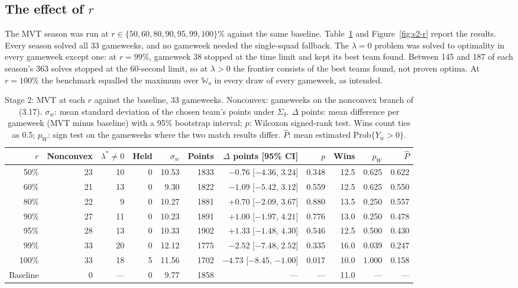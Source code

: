 \subsection{The effect of $r$}
\label{sec:s2-r}

The MVT season was run at $r\in\{50,60,80,90,95,99,100\}\%$ against the same baseline.
Table~\ref{tab:s2-r} and Figure~\ref{fig:s2-r} report the results. Every season solved all 33
gameweeks, and no gameweek needed the single-squad fallback. The $\lambda=0$ problem was solved
to optimality in every gameweek except one: at $r=99\%$, gameweek 38 stopped at the time limit
and kept its best team found. Between 145 and 187 of each season's 363 solves stopped at the
60-second limit, so at $\lambda>0$ the frontier consists of the best teams found, not proven
optima. At $r=100\%$ the benchmark equalled the maximum over $\mathbb{W}_o$ in every draw of
every gameweek, as intended.

\begin{table}[ht]
  \centering
  \caption{Stage 2: MVT at each $r$ against the baseline, 33 gameweeks. Nonconvex: gameweeks on
  the nonconvex branch of (3.17). $\sigma_w$: mean standard deviation of the chosen team's points
  under $\Sigma_\delta$. $\Delta$ points: mean difference per gameweek (MVT minus baseline) with a
  95\% bootstrap interval; $p$: Wilcoxon signed-rank test. Wins count ties as 0.5; $p_W$: sign
  test on the gameweeks where the two match results differ. $\hat P$: mean estimated
  $\mathrm{Prob}\{Y_w>0\}$.}
  \label{tab:s2-r}
  \footnotesize
  \setlength{\tabcolsep}{3pt}
  \begin{tabular}{rrrrrrrrrrr}
    \toprule
    $r$ & Nonconvex & $\lambda^*\neq0$ & Held & $\sigma_w$ & Points & $\Delta$ points [95\% CI] & $p$ & Wins & $p_W$ & $\hat P$ \\
    \midrule
    50\%  & 23 & 10 & 0 & 10.53 & 1833 & $-0.76$ [$-4.36$, $3.24$] & 0.348 & 12.5 & 0.625 & 0.622 \\
    60\%  & 21 & 13 & 0 &  9.30 & 1822 & $-1.09$ [$-5.42$, $3.12$] & 0.559 & 12.5 & 0.625 & 0.550 \\
    80\%  & 22 &  9 & 0 & 10.27 & 1881 & $+0.70$ [$-2.09$, $3.67$] & 0.880 & 13.5 & 0.250 & 0.557 \\
    90\%  & 27 & 11 & 0 & 10.23 & 1891 & $+1.00$ [$-1.97$, $4.21$] & 0.776 & 13.0 & 0.250 & 0.478 \\
    95\%  & 28 & 13 & 0 & 10.33 & 1902 & $+1.33$ [$-1.48$, $4.30$] & 0.546 & 12.5 & 0.500 & 0.430 \\
    99\%  & 33 & 20 & 0 & 12.12 & 1775 & $-2.52$ [$-7.48$, $2.52$] & 0.335 & 16.0 & 0.039 & 0.247 \\
    100\% & 33 & 18 & 5 & 11.56 & 1702 & $-4.73$ [$-8.45$, $-1.00$] & 0.017 & 10.0 & 1.000 & 0.158 \\
    \midrule
    Baseline & 0 & --- & 0 & 9.77 & 1858 & --- & --- & 11.0 & --- & --- \\
    \bottomrule
  \end{tabular}
\end{table}

